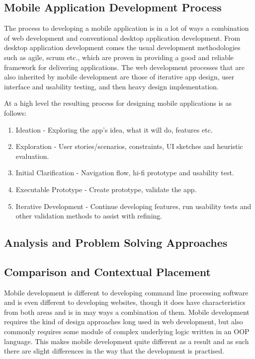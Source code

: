 \documentclass[11pt,english,numbers=endperiod,parskip=half]{scrartcl}
\begin{document}
  \subsection{Mobile Application Development Process}
    The process to developing a mobile application is in a lot of ways a
    combination of web development and conventional desktop application development.
    From desktop application development comes the usual development methodologies
    such as agile, scrum etc., which are proven in providing a good and reliable
    framework for delivering applications. The web development processes that
    are also inherited by mobile development are those of iterative app design,
    user interface and usability testing, and then heavy design implementation.

    At a high level the resulting process for designing mobile applications is
    as follows:
    \begin{enumerate}
      \item{
        Ideation - Exploring the app's idea, what it will do, features etc.
      }
      \item{
        Exploration - User stories/scenarios, constraints, UI sketches and
        heuristic evaluation.
      }
      \item{
        Initial Clarification - Navigation flow, hi-fi prototype and usability
        test.
      }
      \item{
        Executable Prototype - Create prototype, validate the app.
      }
      \item{
        Iterative Development - Continue developing features, run usability
        tests and other validation methods to assist with refining.
      }
    \end{enumerate}
  \subsection{Analysis and Problem Solving Approaches}

  \subsection{Comparison and Contextual Placement}
    Mobile development is different to developing command line processing
    software and is even different to developing websites, though it does have
    characteristics from both areas and is in may ways a combination of them.
    Mobile development requires the kind of design approaches long used in web
    development, but also commonly requires some module of complex underlying
    logic written in an OOP language. This makes mobile development quite different
    as a result and as such there are slight differences in the way that the
    development is practised.
\end{document}
